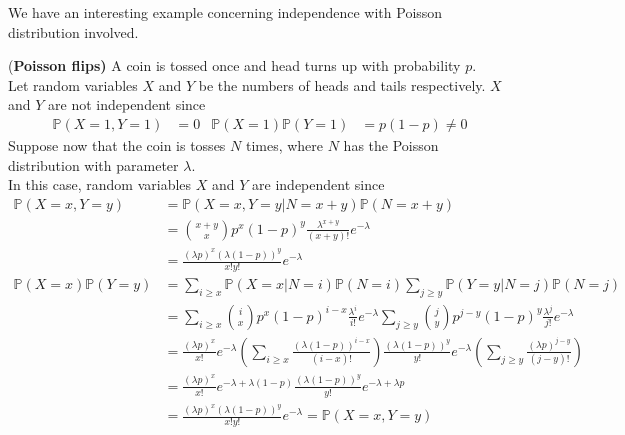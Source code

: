 \documentclass{huhtakm-template-book}
\newcommand{\prob}{\mathbb{P}}
\begin{document}
    We have an interesting example concerning independence with Poisson distribution involved.
    \begin{eg}(\textbf{Poisson flips)}
        A coin is tossed once and head turns up with probability $p$.\\
        Let random variables $X$ and $Y$ be the numbers of heads and tails respectively. $X$ and $Y$ are not independent since
        \begin{align*}
            \prob(X=1,Y=1)&=0 & \prob(X=1)\prob(Y=1)&=p(1-p)\neq 0
        \end{align*}
        Suppose now that the coin is tosses $N$ times, where $N$ has the Poisson distribution with parameter $\lambda$.\\
        In this case, random variables $X$ and $Y$ are independent since
        \begin{align*}
            \prob(X=x,Y=y)&=\prob(X=x,Y=y|N=x+y)\prob(N=x+y)\\
            &=\binom{x+y}{x}p^{x}(1-p)^{y}\frac{\lambda^{x+y}}{(x+y)!}e^{-\lambda}\\
            &=\frac{(\lambda p)^{x}(\lambda(1-p))^{y}}{x!y!}e^{-\lambda}\\
            \prob(X=x)\prob(Y=y)&=\sum_{i\geq x}\prob(X=x|N=i)\prob(N=i)\sum_{j\geq y}\prob(Y=y|N=j)\prob(N=j)\\
            &=\sum_{i\geq x}\binom{i}{x}p^{x}(1-p)^{i-x}\frac{\lambda^{i}}{i!}e^{-\lambda}\sum_{j\geq y}\binom{j}{y}p^{j-y}(1-p)^{y}\frac{\lambda^{j}}{j!}e^{-\lambda}\\
            &=\frac{(\lambda p)^{x}}{x!}e^{-\lambda}\left(\sum_{i\geq x}\frac{(\lambda(1-p))^{i-x}}{(i-x)!}\right)\frac{(\lambda(1-p))^{y}}{y!}e^{-\lambda}\left(\sum_{j\geq y}\frac{(\lambda p)^{j-y}}{(j-y)!}\right)\\
            &=\frac{(\lambda p)^{x}}{x!}e^{-\lambda+\lambda(1-p)}\frac{(\lambda(1-p))^{y}}{y!}e^{-\lambda+\lambda p}\\
            &=\frac{(\lambda p)^{x}(\lambda(1-p))^{y}}{x!y!}e^{-\lambda}=\prob(X=x,Y=y)
        \end{align*}
    \end{eg}
    
\end{document}
